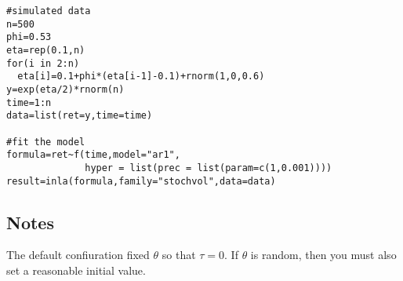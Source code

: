 \documentclass[a4paper,11pt]{article}
\begin{document}
\begin{verbatim}
#simulated data
n=500
phi=0.53
eta=rep(0.1,n)
for(i in 2:n)
  eta[i]=0.1+phi*(eta[i-1]-0.1)+rnorm(1,0,0.6)
y=exp(eta/2)*rnorm(n)
time=1:n
data=list(ret=y,time=time)

#fit the model
formula=ret~f(time,model="ar1",
              hyper = list(prec = list(param=c(1,0.001))))
result=inla(formula,family="stochvol",data=data)

\end{verbatim}

\subsection*{Notes}

The default confiuration fixed $\theta$ so that $\tau=0$.  If $\theta$
is random, then you must also set a reasonable initial value.
\end{document}
